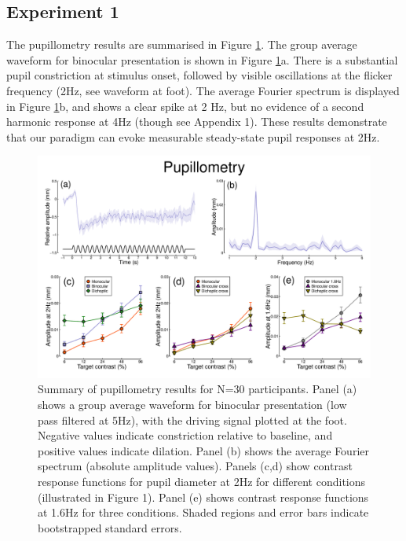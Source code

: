 \documentclass[
]{article}
\begin{document}
\hypertarget{experiment-1}{%
\subsection{Experiment 1}\label{experiment-1}}

The pupillometry results are summarised in Figure \ref{fig:pupildata}. The group average waveform for binocular presentation is shown in Figure \ref{fig:pupildata}a. There is a substantial pupil constriction at stimulus onset, followed by visible oscillations at the flicker frequency (2Hz, see waveform at foot). The average Fourier spectrum is displayed in Figure \ref{fig:pupildata}b, and shows a clear spike at 2 Hz, but no evidence of a second harmonic response at 4Hz (though see Appendix 1). These results demonstrate that our paradigm can evoke measurable steady-state pupil responses at 2Hz.

\begin{figure}

{\centering \includegraphics{Figures/pupildata} 

}

\caption{Summary of pupillometry results for N=30 participants. Panel (a) shows a group average waveform for binocular presentation (low pass filtered at 5Hz), with the driving signal plotted at the foot. Negative values indicate constriction relative to baseline, and positive values indicate dilation. Panel (b) shows the average Fourier spectrum (absolute amplitude values). Panels (c,d) show contrast response functions for pupil diameter at 2Hz for different conditions (illustrated in Figure 1). Panel (e) shows contrast response functions at 1.6Hz for three conditions. Shaded regions and error bars indicate bootstrapped standard errors.}\label{fig:pupildata}
\end{figure}
\end{document}
